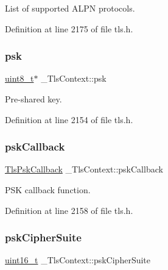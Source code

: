 List of supported A\+L\+PN protocols. 



Definition at line 2175 of file tls.\+h.

\mbox{\label{struct__TlsContext_abe7249236cfe6139a35f9104e64615a2}} 
\subsubsection{\texorpdfstring{psk}{psk}}
{\footnotesize\ttfamily \hyperlink{stdint_8h_aba7bc1797add20fe3efdf37ced1182c5}{uint8\+\_\+t}$\ast$ \+\_\+\+Tls\+Context\+::psk}



Pre-\/shared key. 



Definition at line 2154 of file tls.\+h.

\mbox{\label{struct__TlsContext_aa6dc157adb25fcf8f14110f768936bd1}} 
\subsubsection{\texorpdfstring{psk\+Callback}{pskCallback}}
{\footnotesize\ttfamily \hyperlink{tls_8h_a389807e343d8c65f8080ec9bd71fa91d}{Tls\+Psk\+Callback} \+\_\+\+Tls\+Context\+::psk\+Callback}



P\+SK callback function. 



Definition at line 2158 of file tls.\+h.

\mbox{\label{struct__TlsContext_a1dd31b315bbc5f418f30a66f9a5d1a77}} 
\subsubsection{\texorpdfstring{psk\+Cipher\+Suite}{pskCipherSuite}}
{\footnotesize\ttfamily \hyperlink{stdint_8h_a273cf69d639a59973b6019625df33e30}{uint16\+\_\+t} \+\_\+\+Tls\+Context\+::psk\+Cipher\+Suite}



